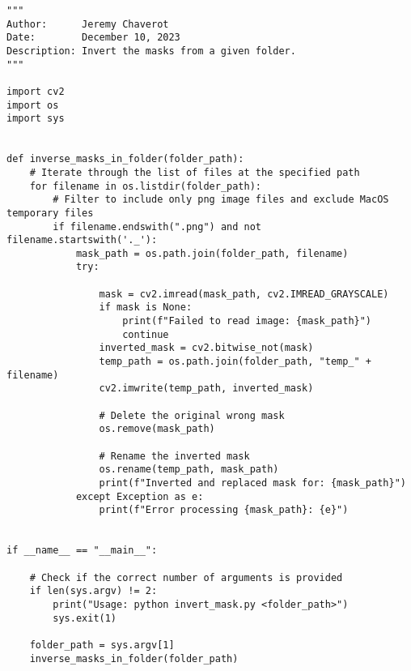 \begin{lstlisting}[style=pythonstyle, label=lst:5, caption=Python script \texttt{invert\_mask.py} to invert the masks from a specified folder. We aim to have a white object set against a black background.]
"""
Author:      Jeremy Chaverot
Date:        December 10, 2023
Description: Invert the masks from a given folder.
"""

import cv2
import os
import sys


def inverse_masks_in_folder(folder_path):
	# Iterate through the list of files at the specified path
    for filename in os.listdir(folder_path):
    	# Filter to include only png image files and exclude MacOS temporary files
        if filename.endswith(".png") and not filename.startswith('._'):
            mask_path = os.path.join(folder_path, filename)
            try:
                
                mask = cv2.imread(mask_path, cv2.IMREAD_GRAYSCALE)
                if mask is None:
                    print(f"Failed to read image: {mask_path}")
                    continue               
                inverted_mask = cv2.bitwise_not(mask)    
                temp_path = os.path.join(folder_path, "temp_" + filename)
                cv2.imwrite(temp_path, inverted_mask)

                # Delete the original wrong mask
                os.remove(mask_path)

                # Rename the inverted mask
                os.rename(temp_path, mask_path)
                print(f"Inverted and replaced mask for: {mask_path}")
            except Exception as e:
                print(f"Error processing {mask_path}: {e}")


if __name__ == "__main__":

	# Check if the correct number of arguments is provided
    if len(sys.argv) != 2:
        print("Usage: python invert_mask.py <folder_path>")
        sys.exit(1)

    folder_path = sys.argv[1]
    inverse_masks_in_folder(folder_path)
\end{lstlisting}

\cleardoublepage{}

